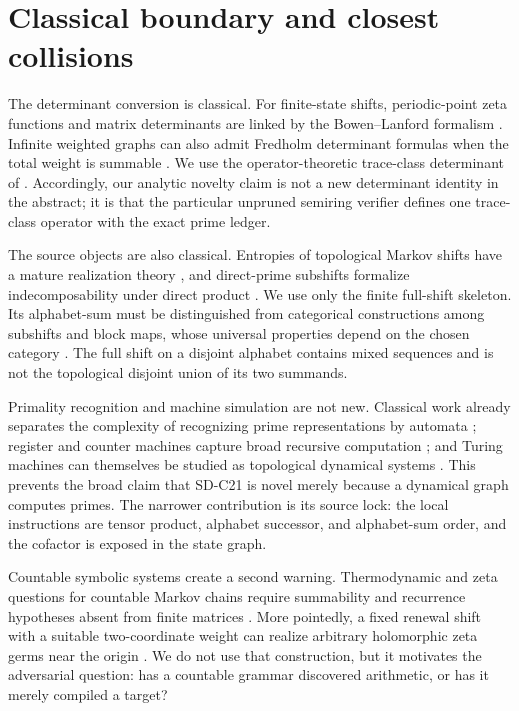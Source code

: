 \section{Classical boundary and closest collisions}
\label{sec:boundary}

The determinant conversion is classical.  For finite-state shifts,
periodic-point zeta functions and matrix determinants are linked by the
Bowen--Lanford formalism \citep{BowenLanford1970}.  Infinite weighted graphs
can also admit Fredholm determinant formulas when the total weight is
summable \citep{Deitmar2015}.  We use the operator-theoretic trace-class
determinant of \citet{Simon1977}.  Accordingly, our analytic novelty claim is
not a new determinant identity in the abstract; it is that the particular
unpruned semiring verifier defines one trace-class operator with the exact
prime ledger.

The source objects are also classical.  Entropies of topological Markov
shifts have a mature realization theory \citep{Lind1984}, and direct-prime
subshifts formalize indecomposability under direct product
\citep{Kopra2023}.  We use only the finite full-shift skeleton.  Its
alphabet-sum must be distinguished from categorical constructions among
subshifts and block maps, whose universal properties depend on the chosen
category \citep{SaloTorma2015}.  The full shift on a disjoint alphabet
contains mixed sequences and is not the topological disjoint union of its
two summands.

Primality recognition and machine simulation are not new.  Classical work
already separates the complexity of recognizing prime representations by
automata \citep{HartmanisShank1968}; register and counter machines capture
broad recursive computation \citep{ShepherdsonSturgis1963}; and Turing
machines can themselves be studied as topological dynamical systems
\citep{Kurka1997}.  This prevents the broad claim that SD-C21 is novel merely
because a dynamical graph computes primes.  The narrower contribution is its
source lock: the local instructions are tensor product, alphabet successor,
and alphabet-sum order, and the cofactor is exposed in the state graph.

Countable symbolic systems create a second warning.  Thermodynamic and zeta
questions for countable Markov chains require summability and recurrence
hypotheses absent from finite matrices \citep{GurevichSavchenko1998,Sarig1999}.
More pointedly, a fixed renewal shift with a suitable two-coordinate weight
can realize arbitrary holomorphic zeta germs near the origin
\citep{Sarig2004Renewal}.  We do not use that construction, but it motivates
the adversarial question: has a countable grammar discovered arithmetic, or
has it merely compiled a target?

